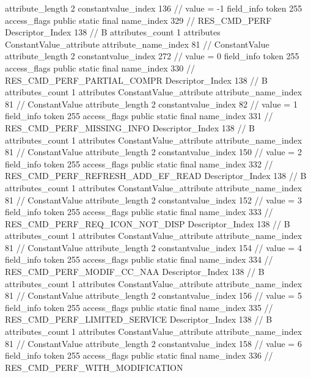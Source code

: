 {{{{{{{					attribute_length	2
					constantvalue_index	136		// value = -1
				}
				}
			}
			field_info {
				token	255
				access_flags	public static final
				name_index	329		// RES_CMD_PERF
				Descriptor_Index	138		// B
				attributes_count	1
				attributes {
				ConstantValue_attribute {
					attribute_name_index	81		// ConstantValue
					attribute_length	2
					constantvalue_index	272		// value = 0
				}
				}
			}
			field_info {
				token	255
				access_flags	public static final
				name_index	330		// RES_CMD_PERF_PARTIAL_COMPR
				Descriptor_Index	138		// B
				attributes_count	1
				attributes {
				ConstantValue_attribute {
					attribute_name_index	81		// ConstantValue
					attribute_length	2
					constantvalue_index	82		// value = 1
				}
				}
			}
			field_info {
				token	255
				access_flags	public static final
				name_index	331		// RES_CMD_PERF_MISSING_INFO
				Descriptor_Index	138		// B
				attributes_count	1
				attributes {
				ConstantValue_attribute {
					attribute_name_index	81		// ConstantValue
					attribute_length	2
					constantvalue_index	150		// value = 2
				}
				}
			}
			field_info {
				token	255
				access_flags	public static final
				name_index	332		// RES_CMD_PERF_REFRESH_ADD_EF_READ
				Descriptor_Index	138		// B
				attributes_count	1
				attributes {
				ConstantValue_attribute {
					attribute_name_index	81		// ConstantValue
					attribute_length	2
					constantvalue_index	152		// value = 3
				}
				}
			}
			field_info {
				token	255
				access_flags	public static final
				name_index	333		// RES_CMD_PERF_REQ_ICON_NOT_DISP
				Descriptor_Index	138		// B
				attributes_count	1
				attributes {
				ConstantValue_attribute {
					attribute_name_index	81		// ConstantValue
					attribute_length	2
					constantvalue_index	154		// value = 4
				}
				}
			}
			field_info {
				token	255
				access_flags	public static final
				name_index	334		// RES_CMD_PERF_MODIF_CC_NAA
				Descriptor_Index	138		// B
				attributes_count	1
				attributes {
				ConstantValue_attribute {
					attribute_name_index	81		// ConstantValue
					attribute_length	2
					constantvalue_index	156		// value = 5
				}
				}
			}
			field_info {
				token	255
				access_flags	public static final
				name_index	335		// RES_CMD_PERF_LIMITED_SERVICE
				Descriptor_Index	138		// B
				attributes_count	1
				attributes {
				ConstantValue_attribute {
					attribute_name_index	81		// ConstantValue
					attribute_length	2
					constantvalue_index	158		// value = 6
				}
				}
			}
			field_info {
				token	255
				access_flags	public static final
				name_index	336		// RES_CMD_PERF_WITH_MODIFICATION
}}}}}
